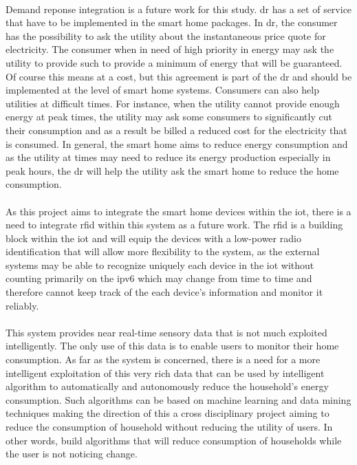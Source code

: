 \documentclass[oneside,12pt,a4paper,final]{book}
\begin{document}
\paragraph{}
Demand reponse integration is a future work for this study. \gls{dr} has a set of service that have to be implemented in the smart home packages. In \gls{dr}, the consumer has the possibility to ask the utility about the instantaneous price quote for electricity. The consumer when in need of high priority in energy may ask the utility to provide such to provide a minimum of energy that will be guaranteed. Of course this means at a cost, but this agreement is part of the \gls{dr} and should be implemented at the level of smart home systems. Consumers can also help utilities at difficult times. For instance, when the utility cannot provide enough energy at peak times, the utility may ask some consumers to significantly cut their consumption and as a result be billed a reduced cost for the electricity that is consumed. In general, the smart home aims to reduce energy consumption and as the utility at times may need to reduce its energy production especially in peak hours, the \gls{dr} will help the utility ask the smart home to reduce the home consumption.
\paragraph{}
As this project aims to integrate the smart home devices within the \gls{iot}, there is a need to integrate \gls{rfid} within this system as a future work. The \gls{rfid} is a building block within the \gls{iot} and will equip the devices with a low-power radio identification that will allow more flexibility to the system, as the external systems may be able to recognize uniquely each device in the \gls{iot} without counting primarily on the \gls{ipv6} which may change from time to time and therefore cannot keep track of the each device's information and monitor it reliably.
\paragraph{}
This system provides near real-time sensory data that is not much exploited intelligently. The only use of this data is to enable users to monitor their home consumption. As far as the system is concerned, there is a need for a more intelligent exploitation of this very rich data that can be used by intelligent algorithm to automatically and autonomously reduce the household's energy consumption. Such algorithms can be based on machine learning and data mining techniques making the direction of this a cross disciplinary project aiming to reduce the consumption of household without reducing the utility of users. In other words, build algorithms that will reduce consumption of households while the user is not noticing change.
\end{document}
